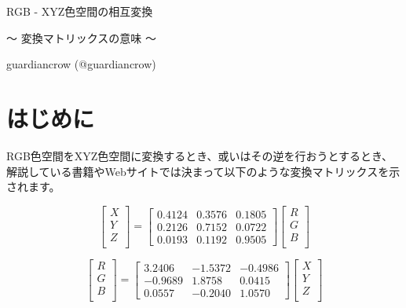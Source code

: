 \documentclass[12pt]{jsarticle}
\begin{document}
\begin{center}
\Huge RGB - XYZ色空間の相互変換
\end{center}

\begin{center}
\large ～ 変換マトリックスの意味 ～
\end{center}

\begin{flushright}
guardiancrow (@guardiancrow)
\end{flushright}

\vspace{3\baselineskip}

\section{はじめに}

RGB色空間をXYZ色空間に変換するとき、或いはその逆を行おうとするとき、解説している書籍やWebサイトでは決まって以下のような変換マトリックスを示されます。

\begin{equation}
\begin{bmatrix}
X \\
Y \\
Z \\
\end{bmatrix}
=
\begin{bmatrix}
0.4124 & 0.3576 & 0.1805 \\
0.2126 & 0.7152 & 0.0722 \\
0.0193 & 0.1192 & 0.9505
\end{bmatrix}
\begin{bmatrix}
R \\
G \\
B \\
\end{bmatrix}
\label{eq:RGBtoXYZ}
\end{equation}

\begin{equation}
\begin{bmatrix}
R \\
G \\
B \\
\end{bmatrix}
=
\begin{bmatrix}
3.2406 & -1.5372 & -0.4986 \\
-0.9689 & 1.8758 & 0.0415 \\
0.0557 & -0.2040 & 1.0570
\end{bmatrix}
\begin{bmatrix}
X \\
Y \\
Z \\
\end{bmatrix}
\label{eq:XYZtoRGB}
\end{equation}
\end{document}
